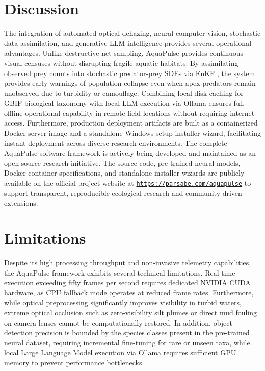 \documentclass[11pt,a4paper]{article}
\newcommand{\urltext}[1]{{\color{linkblue}\underline{\texttt{#1}}}}
\newcommand{\citeblue}[1]{{\color{linkblue}\cite{#1}}}
\begin{document}
\section{Discussion}
The integration of automated optical dehazing, neural computer vision, stochastic data assimilation, and generative LLM intelligence provides several operational advantages. Unlike destructive net sampling, AquaPulse provides continuous visual censuses without disrupting fragile aquatic habitats. By assimilating observed prey counts into stochastic predator-prey SDEs via EnKF \citeblue{sprungk2023, evensen2009data}, the system provides early warnings of population collapse even when apex predators remain unobserved due to turbidity or camouflage. Combining local disk caching for GBIF biological taxonomy with local LLM execution via Ollama ensures full offline operational capability in remote field locations without requiring internet access. Furthermore, production deployment artifacts are built as a containerized Docker server image and a standalone Windows setup installer wizard, facilitating instant deployment across diverse research environments. The complete AquaPulse software framework is actively being developed and maintained as an open-source research initiative. The source code, pre-trained neural models, Docker container specifications, and standalone installer wizards are publicly available on the official project website at \urltext{https://parsabe.com/aquapulse} to support transparent, reproducible ecological research and community-driven extensions.

\section{Limitations}
Despite its high processing throughput and non-invasive telemetry capabilities, the AquaPulse framework exhibits several technical limitations. Real-time execution exceeding fifty frames per second requires dedicated NVIDIA CUDA hardware, as CPU fallback mode operates at reduced frame rates. Furthermore, while optical preprocessing significantly improves visibility in turbid waters, extreme optical occlusion such as zero-visibility silt plumes or direct mud fouling on camera lenses cannot be computationally restored. In addition, object detection precision is bounded by the species classes present in the pre-trained neural dataset, requiring incremental fine-tuning for rare or unseen taxa, while local Large Language Model execution via Ollama requires sufficient GPU memory to prevent performance bottlenecks.
\end{document}
